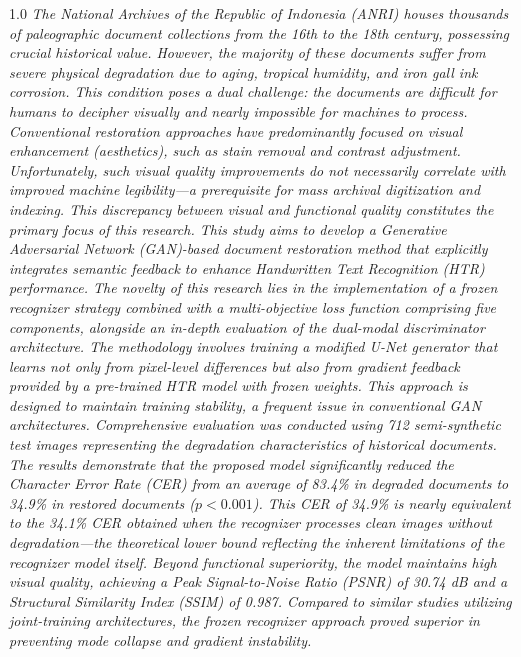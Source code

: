 \begin{spacing}{1.0}
    \noindent
    \textit{The National Archives of the Republic of Indonesia (ANRI) houses thousands of paleographic document collections from the 16th to the 18th century, possessing crucial historical value. However, the majority of these documents suffer from severe physical degradation due to aging, tropical humidity, and iron gall ink corrosion. This condition poses a dual challenge: the documents are difficult for humans to decipher visually and nearly impossible for machines to process. Conventional restoration approaches have predominantly focused on visual enhancement (aesthetics), such as stain removal and contrast adjustment. Unfortunately, such visual quality improvements do not necessarily correlate with improved machine legibility---a prerequisite for mass archival digitization and indexing. This discrepancy between visual and functional quality constitutes the primary focus of this research.
    This study aims to develop a Generative Adversarial Network (GAN)-based document restoration method that explicitly integrates semantic feedback to enhance Handwritten Text Recognition (HTR) performance. The novelty of this research lies in the implementation of a frozen recognizer strategy combined with a multi-objective loss function comprising five components, alongside an in-depth evaluation of the dual-modal discriminator architecture. The methodology involves training a modified U-Net generator that learns not only from pixel-level differences but also from gradient feedback provided by a pre-trained HTR model with frozen weights. This approach is designed to maintain training stability, a frequent issue in conventional GAN architectures.
    Comprehensive evaluation was conducted using 712 semi-synthetic test images representing the degradation characteristics of historical documents. The results demonstrate that the proposed model significantly reduced the Character Error Rate (CER) from an average of 83.4\% in degraded documents to 34.9\% in restored documents ($p<0.001$). This CER of 34.9\% is nearly equivalent to the 34.1\% CER obtained when the recognizer processes clean images without degradation---the theoretical lower bound reflecting the inherent limitations of the recognizer model itself. Beyond functional superiority, the model maintains high visual quality, achieving a Peak Signal-to-Noise Ratio (PSNR) of 30.74 dB and a Structural Similarity Index (SSIM) of 0.987. Compared to similar studies utilizing joint-training architectures, the frozen recognizer approach proved superior in preventing mode collapse and gradient instability.
}
\end{spacing}
